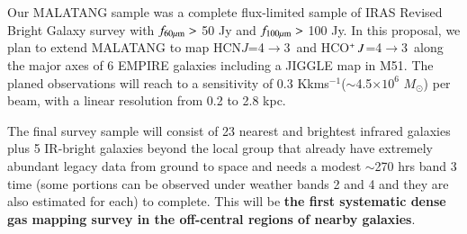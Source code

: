 \documentclass[legal,11pt]{article}
\def\kms    {\ifmmode{{\rm \ts km\ts s}^{-1}}\else{\ts km\ts s$^{-1}$}\fi}
\def\kms    {km\,s$^{-1}$\,}
\def\Kkms{K\,\kms }
\def\,{\thinspace}
\def\Msun{$M_\odot$}
\def\HCNft        {HCN\,$J$=4$\rightarrow$3}
\def\HCOPft     {HCO$^+\,J$=4$\rightarrow$3}
\begin{document}
\begin{center}
{{Our MALATANG sample was a complete flux-limited sample of IRAS Revised Bright Galaxy survey
with $f_{\rm 60\mu m}>$ 50 Jy and $f_{\rm 100\mu m}>$ 100 Jy.  In this proposal, we plan to extend MALATANG to map 
\HCNft\ and \HCOPft\ along the major axes of 6 EMPIRE galaxies including a JIGGLE map in M51.
The planed observations will reach to a sensitivity of 0.3 \Kkms ($\sim$4.5$\times10^6$ \Msun)
per beam, with a linear resolution from 0.2 to 2.8 kpc.  

The final survey sample will consist of 23 nearest and brightest infrared galaxies plus 5 IR-bright galaxies beyond
the local group that already have  extremely abundant legacy data from ground to space and needs a modest $\sim$270 hrs band 3 time (some portions can be observed under weather bands 2 and 4 and they are also estimated for each) to complete.  This will be {\bf the first systematic dense gas mapping survey in the off-central regions of nearby galaxies}. }}

\end{center}
\end{document}

